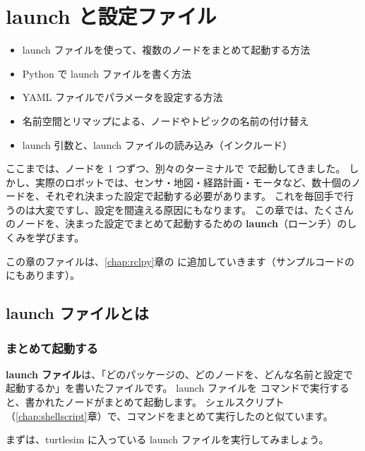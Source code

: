 \chapter{launch と設定ファイル}
\label{chap:launch}

\begin{goalbox}
  \begin{itemize}
    \item launch ファイルを使って、複数のノードをまとめて起動する方法
    \item Python で launch ファイルを書く方法
    \item YAML ファイルでパラメータを設定する方法
    \item 名前空間とリマップによる、ノードやトピックの名前の付け替え
    \item launch 引数と、launch ファイルの読み込み（インクルード）
  \end{itemize}
\end{goalbox}

ここまでは、ノードを 1 つずつ、別々のターミナルで  で起動してきました。
しかし、実際のロボットでは、センサ・地図・経路計画・モータなど、数十個のノードを、それぞれ決まった設定で起動する必要があります。
これを毎回手で行うのは大変ですし、設定を間違える原因にもなります。
この章では、たくさんのノードを、決まった設定でまとめて起動するための \textbf{launch}（ローンチ）のしくみを学びます。

この章のファイルは、\ref{chap:rclpy}章の  に追加していきます（サンプルコードの \allowbreak{} にもあります）。

\section{launch ファイルとは}
\label{sec:launch-what}

\subsection{まとめて起動する}

\textbf{launch ファイル}は、「どのパッケージの、どのノードを、どんな名前と設定で起動するか」を書いたファイルです。
launch ファイルを  コマンドで実行すると、書かれたノードがまとめて起動します。
シェルスクリプト（\ref{chap:shellscript}章）で、コマンドをまとめて実行したのと似ています。

まずは、turtlesim に入っている launch ファイルを実行してみましょう。

